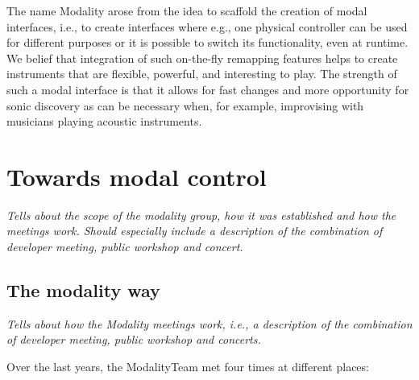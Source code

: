 \documentclass{article}
\begin{document}
The name Modality arose from the idea to scaffold the creation of modal interfaces, i.e., to create interfaces where e.g., one physical controller can be used for different purposes or it is possible to switch its functionality, even at runtime. 
We belief that integration of such on-the-fly remapping features helps to create instruments that are flexible, powerful, and interesting to play. 
The strength of such a modal interface is that it allows for fast changes and more opportunity for sonic discovery as can be necessary when, for example, improvising with musicians playing acoustic instruments. 


\section{Towards modal control}
\label{sec:modal_control}

\emph{Tells about the scope of the modality group, how it was established and how the meetings work. Should especially include a description of the combination of developer meeting, public workshop and concert.}



\subsection{The modality way}
\label{sub:the_modality_way}

\emph{Tells about how the Modality meetings work, i.e., a description of the combination of developer meeting, public workshop and concerts.}


Over the last years, the ModalityTeam met four times at different places:
\end{document}
